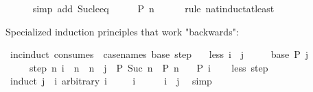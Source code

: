 \begin{isabellebody}
\ \ \ \ \isamarkupfalse%
\ {\isacharparenleft}{\kern0pt}simp\ add{\isacharcolon}{\kern0pt}\ Suc{\isacharunderscore}{\kern0pt}le{\isacharunderscore}{\kern0pt}eq{\isacharparenright}{\kern0pt}\isanewline
\ \ \isamarkupfalse%
\ \isamarkupfalse%
\ {\isachardoublequoteopen}P\ n{\isachardoublequoteclose}\isanewline
\ \ \ \ \isamarkupfalse%
\ {\isacharparenleft}{\kern0pt}rule\ nat{\isacharunderscore}{\kern0pt}induct{\isacharunderscore}{\kern0pt}at{\isacharunderscore}{\kern0pt}least{\isacharparenright}{\kern0pt}\isanewline
{}\isamarkupfalse%
%
\endisatagproof
{\isafoldproof}%
%
\isadelimproof
%
\endisadelimproof
%
\begin{isamarkuptext}%
Specialized induction principles that work "backwards":%
\end{isamarkuptext}\isamarkuptrue%
\isamarkupfalse%
\ inc{\isacharunderscore}{\kern0pt}induct\ {\isacharbrackleft}{\kern0pt}consumes\ {}{\isacharcomma}{\kern0pt}\ case{\isacharunderscore}{\kern0pt}names\ base\ step{\isacharbrackright}{\kern0pt}{\isacharcolon}{\kern0pt}\isanewline
\ \ \ less{\isacharcolon}{\kern0pt}\ {\isachardoublequoteopen}i\ {\isasymle}\ j{\isachardoublequoteclose}\isanewline
\ \ \ \ \ base{\isacharcolon}{\kern0pt}\ {\isachardoublequoteopen}P\ j{\isachardoublequoteclose}\isanewline
\ \ \ \ \ step{\isacharcolon}{\kern0pt}\ {\isachardoublequoteopen}{\isasymAnd}n{\isachardot}{\kern0pt}\ i\ {\isasymle}\ n\ {\isasymLongrightarrow}\ n\ {\isacharless}{\kern0pt}\ j\ {\isasymLongrightarrow}\ P\ {\isacharparenleft}{\kern0pt}Suc\ n{\isacharparenright}{\kern0pt}\ {\isasymLongrightarrow}\ P\ n{\isachardoublequoteclose}\isanewline
\ \ \ {\isachardoublequoteopen}P\ i{\isachardoublequoteclose}\isanewline
%
\isadelimproof
\ \ %
\endisadelimproof
%
\isatagproof
{}\isamarkupfalse%
\ less\ step\isanewline
{}\isamarkupfalse%
\ {\isacharparenleft}{\kern0pt}induct\ {\isachardoublequoteopen}j\ {\isacharminus}{\kern0pt}\ i{\isachardoublequoteclose}\ arbitrary{\isacharcolon}{\kern0pt}\ i{\isacharparenright}{\kern0pt}\isanewline
\ \ \isamarkupfalse%
\ {\isacharparenleft}{\kern0pt}{}\ i{\isacharparenright}{\kern0pt}\isanewline
\ \ \isamarkupfalse%
\ \isamarkupfalse%
\ {\isachardoublequoteopen}i\ {\isacharequal}{\kern0pt}\ j{\isachardoublequoteclose}\ \isamarkupfalse%
\ simp\isanewline
\ \ \isamarkupfalse%

\end{isabellebody}

